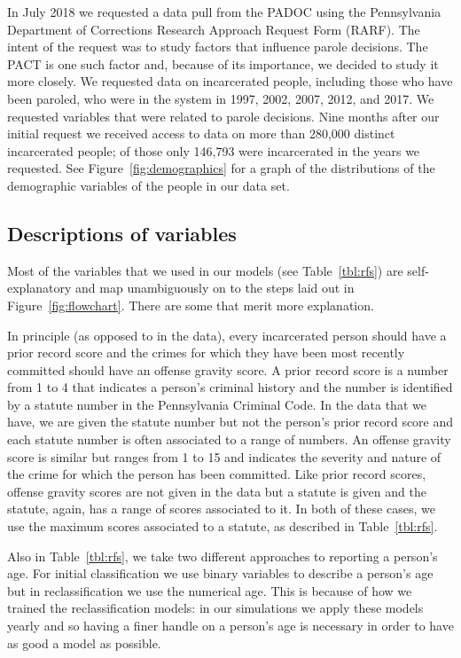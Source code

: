 \documentclass{amsproc}
\numberwithin{equation}{section}
\theoremstyle{plain}
\theoremstyle{remark}
\begin{document}
In July 2018 we requested a data pull from the PADOC using the Pennsylvania Department of Corrections Research Approach Request Form (RARF).  The intent of the request was to study factors that influence parole decisions. The PACT is one such factor and, because of its importance, we decided to study it more closely.  We requested data on incarcerated people, including those who have been paroled, who were in the system in 1997, 2002, 2007, 2012, and 2017.  We requested variables that were related to parole decisions.  Nine months after our initial request we received access to data on more than 280,000 distinct incarcerated people; of those only 146,793 were incarcerated in the years we requested.  See Figure~\ref{fig:demographics} for a graph of the distributions of the demographic variables of the people in our data set.

\subsection{Descriptions of variables}

Most of the variables that we used in our models (see Table~\ref{tbl:rfs}) are self-explanatory and map unambiguously on to the steps laid out in Figure~\ref{fig:flowchart}.  There are some that merit more explanation.  

In principle (as opposed to in the data), every incarcerated person should have a prior record score and the crimes for which they have been most recently committed should have an offense gravity score.  A prior record score is a number from 1 to 4 that indicates a person's criminal history and the number is identified by a statute number in the Pennsylvania Criminal Code.  In the data that we have, we are given the statute number but not the person's prior record score and each statute number is often associated to a range of numbers.  An offense gravity score is similar but ranges from 1 to 15 and indicates the severity and nature of the crime for which the person has been committed.  Like prior record scores, offense gravity scores are not given in the data but a statute is given and the statute, again, has a range of scores associated to it.  In both of these cases, we use the maximum scores associated to a statute, as described in Table~\ref{tbl:rfs}.

Also in Table~\ref{tbl:rfs}, we take two different approaches to reporting a person's age.  For initial classification we use binary variables to describe a person's age but in reclassification we use the numerical age.  This is because of how we trained the reclassification models: in our simulations we apply these models yearly and so having a finer handle on a person's age is necessary in order to have as good a model as possible.
\end{document}
